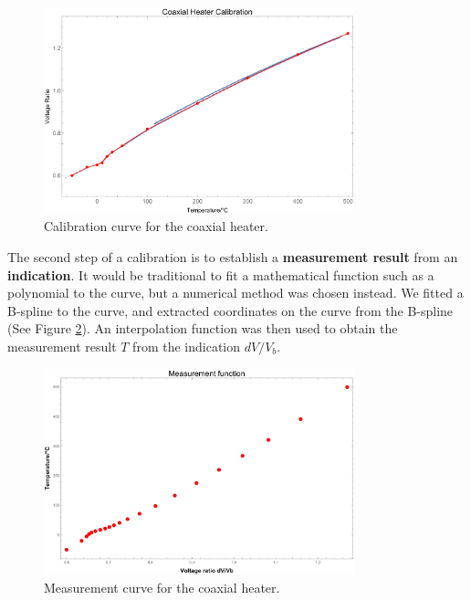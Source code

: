 \begin{figure}
	\centering
	\includegraphics[width=0.8\textwidth]{./Figures/2019_07_12_B-spline_fit_CPlot.pdf}
	\decoRule
	\caption[Calibration curve of the coaxial heater]{Calibration curve for the coaxial heater.}	
	\label{fig:CalibrationCurve}
\end{figure}

The second step of a calibration is to establish a \textbf{measurement result}
from an \textbf{indication}. It would be traditional to fit a mathematical
function such as a polynomial to the curve, but a numerical method was chosen
instead. We fitted a B-spline to the curve, and extracted coordinates on the
curve from the B-spline (See Figure \ref{fig:MeasurementCurve}). An
interpolation function was then used to obtain the measurement result \(T\) from
the indication \(dV/V_b\).

\begin{figure}
	\centering
	\includegraphics[width=0.8\textwidth]{./Figures/2019_07_12_B-spline_fit_PPlot.pdf}
	\decoRule
	\caption[Measurement curve of the coaxial heater]{Measurement curve for the coaxial heater.}	
	\label{fig:MeasurementCurve}
\end{figure}


